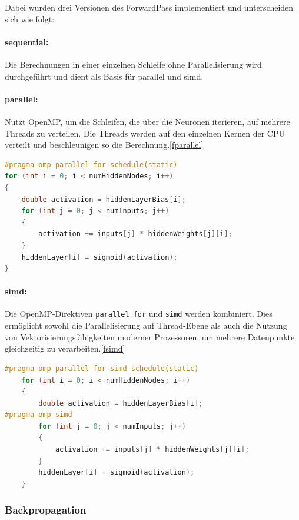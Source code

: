 \documentclass[a4paper, 12pt]{article}
\begin{document}
Dabei wurden drei Versionen des ForwardPass implementiert und unterscheiden sich wie folgt:

\paragraph{sequential:}

Die Berechnungen in einer einzelnen Schleife ohne Parallelisierung wird durchgeführt und 
dient als Basis für parallel und simd.

\paragraph{parallel:}

Nutzt OpenMP, um die Schleifen, die über die Neuronen iterieren, auf mehrere Threads zu verteilen. 
Die Threads werden auf den einzelnen Kernen der CPU verteilt und beschleunigen so die 
Berechnung.\ref{fparallel}
\begin{lstlisting}[language=C, caption={forwardpass parallel}, label={fparallel}]
#pragma omp parallel for schedule(static)
for (int i = 0; i < numHiddenNodes; i++)
{
    double activation = hiddenLayerBias[i];
    for (int j = 0; j < numInputs; j++)
    {
        activation += inputs[j] * hiddenWeights[j][i];
    }
    hiddenLayer[i] = sigmoid(activation);
}
\end{lstlisting}

\paragraph{simd:}
Die OpenMP-Direktiven \texttt{parallel for} und \texttt{simd} werden kombiniert. Dies ermöglicht sowohl die Parallelisierung auf Thread-Ebene als auch die Nutzung von Vektorisierungsfähigkeiten moderner Prozessoren, um mehrere Datenpunkte gleichzeitig zu verarbeiten.\ref{fsimd}
\begin{lstlisting}[language=C, caption={forwardpass simd}, label={fsimd}]
#pragma omp parallel for simd schedule(static)
    for (int i = 0; i < numHiddenNodes; i++)
    {
        double activation = hiddenLayerBias[i];
#pragma omp simd
        for (int j = 0; j < numInputs; j++)
        {
            activation += inputs[j] * hiddenWeights[j][i];
        }
        hiddenLayer[i] = sigmoid(activation);
    }
\end{lstlisting}


\subsubsection{Backpropagation}
\end{document}
